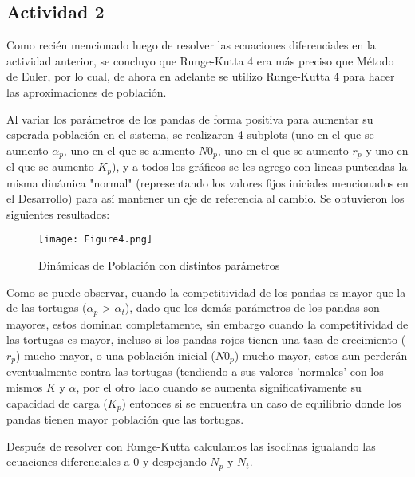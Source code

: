 \documentclass{article}
\begin{document}
\vspace{1\baselineskip}

\subsection*{Actividad 2}
\noindent Como recién mencionado luego de resolver las ecuaciones diferenciales en la actividad anterior, se concluyo que Runge-Kutta 4 era más preciso que Método de Euler, por lo cual, de ahora en adelante se utilizo Runge-Kutta 4 para hacer las aproximaciones de población.
\vspace{1\baselineskip}

\noindent Al variar los parámetros de los pandas de forma positiva para aumentar su esperada población en el sistema, se realizaron 4 subplots (uno en el que se aumento $\alpha_p$, uno en el que se aumento $N0_p$, uno en el que se aumento $r_p$ y uno en el que se aumento $K_p$), y a todos los gráficos se les agrego con lineas punteadas la misma dinámica "normal" (representando los valores fijos iniciales mencionados en el Desarrollo) para así mantener un eje de referencia al cambio. Se obtuvieron los siguientes resultados:

\begin{figure}[ht]
    \centering
    \caption{Dinámicas de Población con distintos parámetros}
    \texttt{[image: Figure4.png]}
    \label{fig:Image 1.1}
\end{figure}

\noindent Como se puede observar, cuando la competitividad de los pandas es mayor que la de las tortugas ($\alpha_p$ > $\alpha_t$), dado que los demás parámetros de los pandas son mayores, estos dominan completamente, sin embargo cuando la competitividad de las tortugas es mayor, incluso si los pandas rojos tienen una tasa de crecimiento ($r_p$) mucho mayor, o una población inicial ($N0_p$) mucho mayor, estos aun perderán eventualmente contra las tortugas (tendiendo a sus valores 'normales' con los mismos $K$ y $\alpha$, por el otro lado cuando se aumenta significativamente su capacidad de carga ($K_p$) entonces si se encuentra un caso de equilibrio donde los pandas tienen mayor población que las tortugas.
\vspace{1\baselineskip}

\noindent Después de resolver con Runge-Kutta calculamos las isoclinas igualando las ecuaciones diferenciales a 0 y despejando $N_p$ y $N_t$.
\vspace{0.5\baselineskip}
\end{document}
